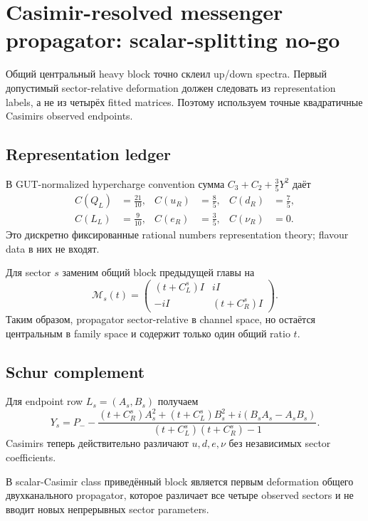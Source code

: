 \chapter{Casimir-resolved messenger propagator: scalar-splitting no-go}

Общий центральный heavy block точно склеил up/down spectra. Первый допустимый
sector-relative deformation должен следовать из representation labels, а не
из четырёх fitted matrices. Поэтому используем точные квадратичные Casimirs
observed endpoints.

\section{Representation ledger}

В GUT-normalized hypercharge convention сумма
\(C_3+C_2+\frac35Y^2\) даёт
\begin{align}
 C(Q_L)&=\frac{21}{10},& C(u_R)&=\frac85,& C(d_R)&=\frac75,\\
 C(L_L)&=\frac9{10},& C(e_R)&=\frac35,& C(\nu_R)&=0.
\end{align}
Это дискретно фиксированные rational numbers representation theory; flavour
data в них не входят.

Для sector \(s\) заменим общий block предыдущей главы на
\begin{equation}
 \mathcal M_s(t)=
 \begin{pmatrix}
 (t+C_L^s)I&iI\\
 -iI&(t+C_R^s)I
 \end{pmatrix}.
\end{equation}
Таким образом, propagator sector-relative в channel space, но остаётся
центральным в family space и содержит только один общий ratio \(t\).

\section{Schur complement}

Для endpoint row \(L_s=(A_s,B_s)\) получаем
\begin{equation}
 Y_s=P_--\frac{
 (t+C_R^s)A_s^2+(t+C_L^s)B_s^2+i(B_sA_s-A_sB_s)
 }{(t+C_L^s)(t+C_R^s)-1}.
\end{equation}
Casimirs теперь действительно различают \(u,d,e,\nu\) без независимых
sector coefficients.

\begin{proposition}
В scalar-Casimir class приведённый block является первым deformation общего
двухканального propagator, которое различает все четыре observed sectors и
не вводит новых непрерывных sector parameters.
\end{proposition}

